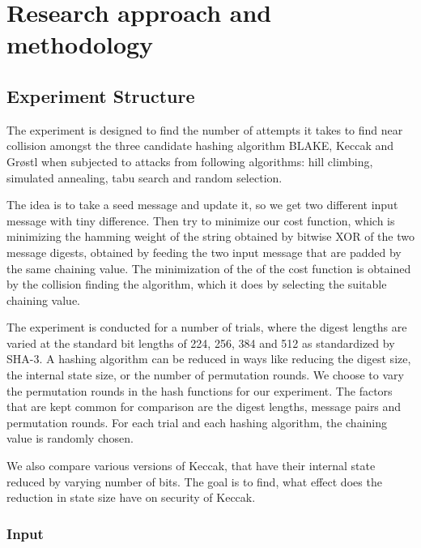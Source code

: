 \chapter{Research approach and methodology}

\section{Experiment Structure}

The experiment is designed to find the number of attempts it takes to find near collision amongst the three
candidate hashing algorithm BLAKE, Keccak and Gr{\o}stl when subjected to attacks from following algorithms:
hill climbing, simulated annealing, tabu search and random selection. 

The idea is to take a seed message and update it, so we get two different input message with tiny difference. 
Then try to minimize our cost function, which is minimizing the hamming weight of the string obtained by bitwise
XOR of the two message digests, obtained by feeding the two input message that are padded by the same chaining 
value. The minimization of the of the cost function is obtained by the collision finding the algorithm, which 
it does by selecting the suitable chaining value.

The experiment is conducted for a number of trials, where the digest lengths are varied at the standard bit
lengths of 224, 256, 384 and 512 as standardized by SHA-3.
A hashing algorithm can be reduced in ways like reducing the digest size, the internal state size, or the
number of permutation rounds. We choose to vary the permutation rounds in the hash functions for our experiment.
The factors that are kept common for comparison are the digest lengths, message pairs and permutation rounds.
For each trial and each hashing algorithm, the chaining value is randomly chosen.

We also compare various versions of Keccak, that have their internal state reduced by varying number of bits. 
The goal is to find, what effect does the reduction in state size have on security of Keccak.

\subsection{Input}

